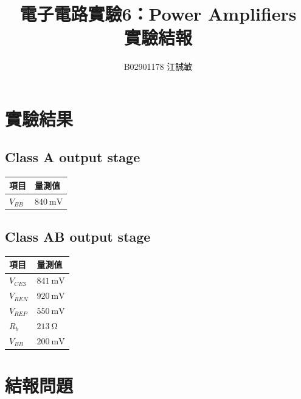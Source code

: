 \documentclass[12pt, a4paper]{article}
\title{ \bf {\Huge 電子電路實驗6：Power Amplifiers}\\ 實驗結報}
\author{B02901178 江誠敏}
\begin{document}
\maketitle


\section{實驗結果}
\subsection{Class A output stage}
\begin{center}
	\begin{tabular}{p{3cm}p{4.5cm}}
	\hline
	項目 & 量測值 \\
  \hline
  \hline
  $V_{BB}$ & $\SI{840}\mV$ \\
  \hline
  \end{tabular}
\end{center}

\subsection{Class AB output stage}
\begin{center}
	\begin{tabular}{p{3cm}p{4.5cm}}
	\hline
	項目 & 量測值 \\
  \hline
  \hline
  $V_{CE3}$ & $\SI{841}\mV$ \\
  $V_{REN}$ & $\SI{920}\mV$ \\
  $V_{REP}$ & $\SI{550}\mV$ \\
  $R_b$ & $\SI{213}{\ohm}$ \\
  $V_{BB}$ & $\SI{200}\mV$ \\
  \hline
  \end{tabular}
\end{center}

\section{結報問題}
\end{document}
